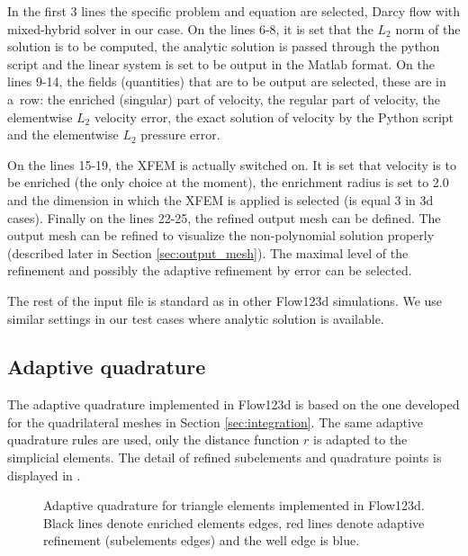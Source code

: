 In the first 3 lines the specific problem and equation are selected,
Darcy flow with mixed-hybrid solver in our case. On the lines 6-8, it is set that the $L_2$ norm of the solution is to be computed,
the analytic solution is passed through the python script and the linear system is set to be output in the Matlab format.
On the lines 9-14, the fields (quantities) that are to be output are selected, these are in a~row: the enriched (singular) part of velocity,
the regular part of velocity, the elementwise $L_2$ velocity error, the exact solution of velocity by the Python script and the elementwise $L_2$ pressure error.

On the lines 15-19, the XFEM is actually switched on. It is set that velocity is to be enriched (the only choice at the moment),
the enrichment radius is set to 2.0 and the dimension in which the XFEM is applied is selected (is equal 3 in 3d cases).
Finally on the lines 22-25, the refined output mesh can be defined. The output mesh can be refined to visualize the non-polynomial solution properly
(described later in Section \ref{sec:output_mesh}). The maximal level of the refinement and possibly the adaptive refinement by error can be selected.

The rest of the input file is standard as in other Flow123d simulations.
We use similar settings in our test cases where analytic solution is available.




\subsection{Adaptive quadrature}
The adaptive quadrature implemented in Flow123d is based on the one developed for the quadrilateral meshes
in Section \ref{sec:integration}. The same adaptive quadrature rules are used, only the distance function $r$
is adapted to the simplicial elements. The detail of refined subelements and quadrature points
is displayed in .
%
\begin{figure}[!htb]
  \centering    
  \hspace{0pt}
  \caption[Adaptive quadrature in Flow123d.]
  {Adaptive quadrature for triangle elements implemented in Flow123d.
   Black lines denote enriched elements edges, red lines denote adaptive refinement (subelements edges) and the well
   edge is blue.
  }
  \label{fig:adapt_refinement_flow123d}
\end{figure}

